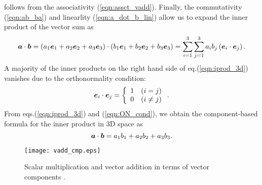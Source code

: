 \documentclass[10pt,a4j]{article}
\begin{document}
follows from the associativity (\ref{eqn:assct_vadd}). 
Finally, the commutativity (\ref{eqn:ab_ba}) and linearlity (\ref{eqn:a_dot_b_lin}) allow us to expand the inner product of the vector sum as 
\begin{equation}
    \mbox{\boldmath $a$}\cdot\mbox{\boldmath $b$}=
    \left(a_1\mbox{\boldmath $e$}_1+ a_2\mbox{\boldmath $e$}_2+ a_3\mbox{\boldmath $e$}_3 \right)
    \cdot
    \left(b_1\mbox{\boldmath $e$}_1+ b_2\mbox{\boldmath $e$}_2+ b_3\mbox{\boldmath $e$}_3 \right) 
    =
    \sum_{i=1}^3\sum_{j=1}^3
    a_ib_j\left(\mbox{\boldmath $e$}_i\cdot\mbox{\boldmath $e$}_j\right).
    \label{eqn:iprod_3d}
\end{equation}
A majority of the inner products on the right hand side of eq.(\ref{eqn:iprod_3d}) vanishes due to the orthonormality condition: 
\begin{equation}
    \mbox{\boldmath $e$}_i\cdot\mbox{\boldmath $e$}_j=
    \left\{
        \begin{array}{cc}
            1 & (i=j) \\
            0 & (i\neq j)
        \end{array}
    \right.
    \label{eqn:ON_cond}.
\end{equation}
From eqs.(\ref{eqn:iprod_3d}) and (\ref{eqn:ON_cond}), we obtain the component-based formula 
for the inner product in 3D space as 
\begin{equation}
    \mbox{\boldmath $a$}\cdot\mbox{\boldmath $b$}= a_1b_1+a_2b_2+a_3b_3.
    \label{eqn:}
\end{equation}
\begin{figure}[h]
    \begin{center}
    \texttt{[image: vadd\_cmp.eps]} 
    \end{center}
    \caption{Scalar multiplication and vector addition in terms of vector components .} 
    \label{fig:fig8}
\end{figure}
%
\end{document}
